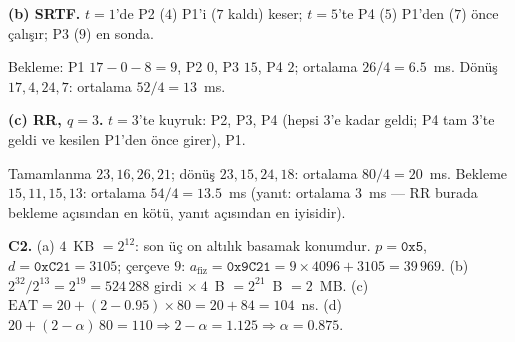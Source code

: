 \textbf{(b) SRTF.} $t=1$'de P2 ($4$) P1'i ($7$ kaldı) keser; $t=5$'te P4 ($5$) P1'den ($7$) önce çalışır; P3 ($9$) en sonda.
\begin{center}\end{center}
Bekleme: P1 $17-0-8 = 9$, P2 $0$, P3 $15$, P4 $2$; ortalama $26/4 = 6.5$~ms. Dönüş $17, 4, 24, 7$: ortalama $52/4 = 13$~ms.

\textbf{(c) RR, $q=3$.} $t=3$'te kuyruk: P2, P3, P4 (hepsi $3$'e kadar geldi; P4 tam $3$'te geldi ve kesilen P1'den önce girer), P1.
\begin{center}\end{center}
Tamamlanma $23, 16, 26, 21$; dönüş $23, 15, 24, 18$: ortalama $80/4 = 20$~ms. Bekleme $15, 11, 15, 13$: ortalama $54/4 = 13.5$~ms (yanıt: ortalama $3$~ms --- RR burada bekleme açısından en kötü, yanıt açısından en iyisidir).

\textbf{C2.} (a) $4$~KB $= 2^{12}$: son üç on altılık basamak konumdur. $p = \texttt{0x5}$, $d = \texttt{0xC21} = 3105$; çerçeve $9$: $a_{\text{fiz}} = \texttt{0x9C21} = 9 \times 4096 + 3105 = 39\,969$. (b) $2^{32}/2^{13} = 2^{19} = 524\,288$ girdi $\times\ 4$~B $= 2^{21}$~B $= 2$~MB. (c) $\text{EAT} = 20 + (2 - 0.95) \times 80 = 20 + 84 = 104$~ns. (d) $20 + (2-\alpha)\,80 = 110 \Rightarrow 2 - \alpha = 1.125 \Rightarrow \alpha = 0.875$.


